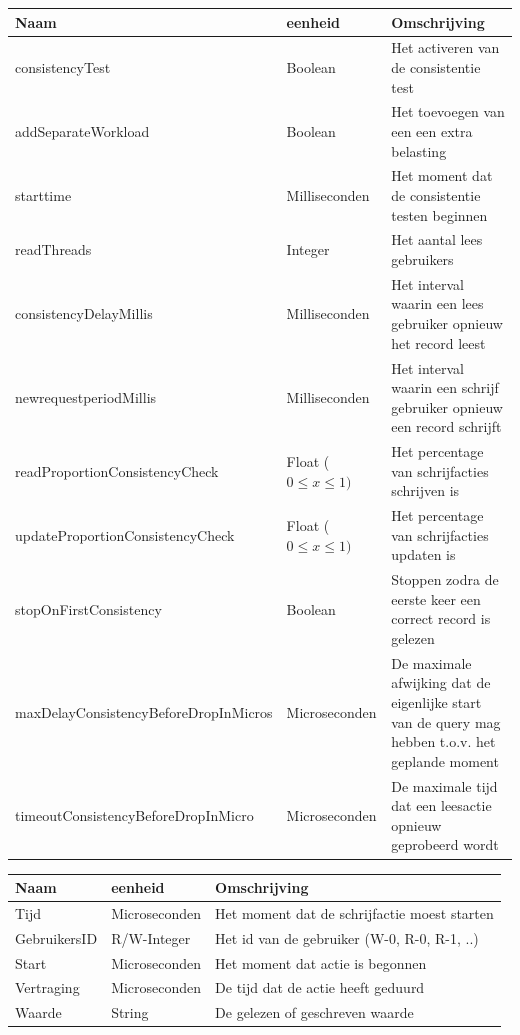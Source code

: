 \begin{table}[t]
		\begin{tabular}{l|l|l}
			\textbf{Naam} & \textbf{eenheid} & \textbf{Omschrijving} \\ 
			\hline consistencyTest & Boolean & Het activeren van de consistentie test\\ 
			addSeparateWorkload & Boolean & Het toevoegen van een een extra belasting \\ 
			starttime & Milliseconden & Het moment dat de consistentie testen beginnen \\
			readThreads & Integer & Het aantal lees gebruikers \\ 
			consistencyDelayMillis & Milliseconden & Het interval waarin een lees gebruiker opnieuw het record leest \\ 
			newrequestperiodMillis & Milliseconden & Het interval waarin een schrijf gebruiker opnieuw een record schrijft \\ 
			readProportionConsistencyCheck & Float ($0\leq x \leq 1)$ & Het percentage van schrijfacties schrijven is \\ 
			updateProportionConsistencyCheck & Float ($0\leq x \leq 1)$ & Het percentage van schrijfacties updaten is \\ 
			stopOnFirstConsistency & Boolean & Stoppen zodra de eerste keer een correct record is gelezen \\ 
			maxDelayConsistencyBeforeDropInMicros & Microseconden & De maximale afwijking dat de eigenlijke start van de query mag hebben t.o.v. het geplande moment \\ 
			timeoutConsistencyBeforeDropInMicro & Microseconden & De maximale tijd dat een leesactie opnieuw geprobeerd wordt\\
		\end{tabular} 
	\label{table:consistentieinput}
\end{table}
\hfill


\begin{table}[t]
\centering
		\begin{tabular}{l|l|l}
			\textbf{Naam} & \textbf{eenheid} & \textbf{Omschrijving} \\ 
			\hline Tijd & Microseconden & Het moment dat de schrijfactie moest starten\\ 
			GebruikersID & R/W-Integer & Het id van de gebruiker (W-0, R-0, R-1, ..) \\ 
			Start & Microseconden & Het moment dat actie is begonnen \\
			Vertraging & Microseconden & De tijd dat de actie heeft geduurd \\ 
			Waarde & String & De gelezen of geschreven waarde \\ 
		\end{tabular} 
	\label{table:consistentieuitvoer}
\end{table}

